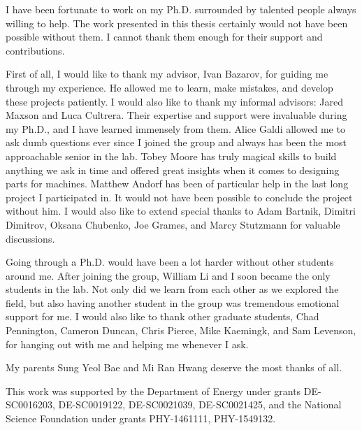 \begin{acknowledgements}

I have been fortunate to work on my Ph.D. surrounded by talented people always willing to help.
The work presented in this thesis certainly would not have been possible without them.
I cannot thank them enough for their support and contributions.

First of all, I would like to thank my advisor, Ivan Bazarov, for guiding me through my experience.
He allowed me to learn, make mistakes, and develop these projects patiently.
I would also like to thank my informal advisors: Jared Maxson and Luca Cultrera. Their expertise and support were invaluable during my Ph.D., and I have learned immensely from them.
Alice Galdi allowed me to ask dumb questions ever since I joined the group and always has been the most approachable senior in the lab.
Tobey Moore has truly magical skills to build anything we ask in time and offered great insights when it comes to designing parts for machines.
Matthew Andorf has been of particular help in the last long project I participated in. It would not have been possible to conclude the project without him.
I would also like to extend special thanks to Adam Bartnik, Dimitri Dimitrov, Oksana Chubenko, Joe Grames, and Marcy Stutzmann for valuable discussions.

Going through a Ph.D. would have been a lot harder without other students around me. After joining the group, William Li and I soon became the only students in the lab. Not only did we learn from each other as we explored the field, but also having another student in the group was tremendous emotional support for me.
I would also like to thank other graduate students, Chad Pennington, Cameron Duncan, Chris Pierce, Mike Kaemingk, and Sam Levenson, for hanging out with me and helping me whenever I ask.

My parents Sung Yeol Bae and Mi Ran Hwang deserve the most thanks of all.

This work was supported by the Department of Energy under grants DE-SC0016203, DE-SC0019122, DE-SC0021039, DE-SC0021425, and the National Science Foundation under grants PHY-1461111, PHY-1549132.

\end{acknowledgements}